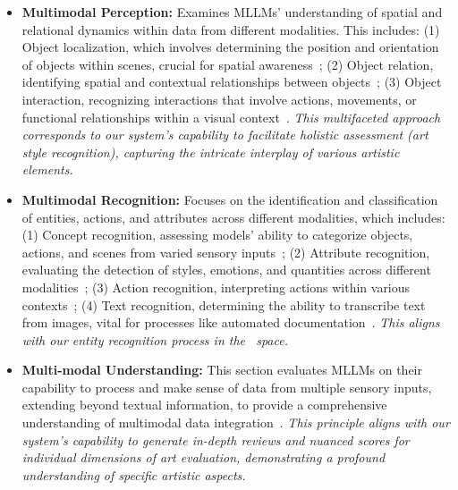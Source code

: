 \begin{itemize}[leftmargin=*]
    \item \textbf{Multimodal Perception:} Examines MLLMs' understanding of spatial and relational dynamics within data from different modalities. This includes: 
    (1) Object localization, which involves determining the position and orientation of objects within scenes, crucial for spatial awareness~\cite{chen2024gmai,yu2023mm}; 
    (2) Object relation, identifying spatial and contextual relationships between objects~\cite{liu2023mmbench,bai2023qwen}; 
    (3) Object interaction, recognizing interactions that involve actions, movements, or functional relationships within a visual context~\cite{chen2024plug,zhao2023vlchecklist}. \textit{This multifaceted approach corresponds to our system's capability to facilitate holistic assessment (art style recognition), capturing the intricate interplay of various artistic elements.}
    

    \item \textbf{Multimodal Recognition:} Focuses on the identification and classification of entities, actions, and attributes across different modalities, which includes: 
    (1) Concept recognition, assessing models' ability to categorize objects, actions, and scenes from varied sensory inputs~\cite{liu2023mmbench,li2023seed,yu2023mm}; 
    (2) Attribute recognition, evaluating the detection of styles, emotions, and quantities across different modalities~\cite{liu2023mmbench,awadalla2023openflamingo}; 
    (3) Action recognition, interpreting actions within various contexts~\cite{liu2023mmbench,dai2023instructblip}; 
    (4) Text recognition, determining the ability to transcribe text from images, vital for processes like automated documentation~\cite{liu2023mmbench,achiam2023gpt}. \textit{This aligns with our entity recognition process in the \dataset~space.}
    
    \item \textbf{Multi-modal Understanding:} This section evaluates MLLMs on their capability to process and make sense of data from multiple sensory inputs, extending beyond textual information, to provide a comprehensive understanding of multimodal data integration~\cite{huang2024survey}. \textit{This principle aligns with our system's capability to generate in-depth reviews and nuanced scores for individual dimensions of art evaluation, demonstrating a profound understanding of specific artistic aspects.}
    

\end{itemize}
